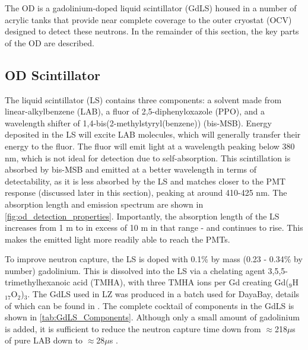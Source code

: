 \par
The OD is a gadolinium-doped liquid scintillator (GdLS) housed in a number of acrylic tanks that provide near complete coverage to the outer cryostat (OCV) designed to detect these neutrons.
In the remainder of this section, the key parts of the OD are described.



\subsection{OD Scintillator}
\par
The liquid scintillator (LS) contains three components: a solvent made from linear-alkylbenzene (LAB), a fluor of 2,5-diphenyloxazole (PPO), and a wavelength shifter of 1,4-bis(2-methylstyryl(benzene)) (bis-MSB).
Energy deposited in the LS will excite LAB molecules, which will generally transfer their energy to the fluor. 
The fluor will emit light at a wavelength peaking below 380 nm, which is not ideal for detection due to self-absorption.
This scintillation is absorbed by bis-MSB and emitted at a better wavelength in terms of detectability, as it is less absorbed by the LS and matches closer to the PMT response (discussed later in this section), peaking at around 410-425 nm.
The absorption length and emission spectrum are shown in \autoref{fig:od_detection_properties}.
Importantly, the absorption length of the LS increases from 1 m to in excess of 10 m in that range - and continues to rise.
This makes the emitted light more readily able to reach the PMTs.



\par
To improve neutron capture, the LS is doped with 0.1\% by mass (0.23 - 0.34\% by number) gadolinium.
This is dissolved into the LS via a chelating agent 3,5,5-trimethylhexanoic acid (TMHA), with three TMHA ions per Gd creating Gd(${}_{9}$H${}_{17}$O${}_{2}$)${}_{3}$.
The GdLS used in LZ was produced in a batch used for DayaBay, details of which can be found in \cite{dayabay_gd_doping_ref}.
The complete cocktail of components in the GdLS is shown in \autoref{tab:GdLS_Components}.
Although only a small amount of gadolinium is added, it is sufficient to reduce the neutron capture time down from $\approx$218$\mu$s of pure LAB down to $\approx$28$\mu$s \cite{ucsb_gdls_dicebox_simulations_ref}.

